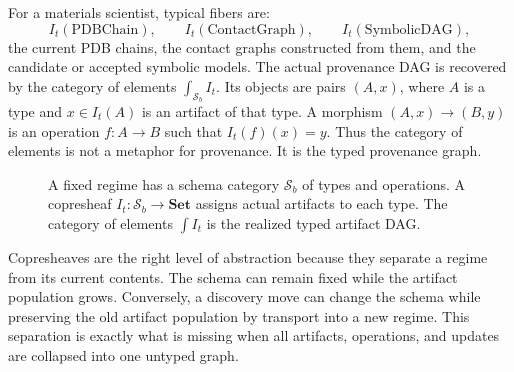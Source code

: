 \documentclass[11pt]{article}
\theoremstyle{definition}
\newcommand{\Sschema}{\mathcal{S}}
\newcommand{\Set}{\mathbf{Set}}
\begin{document}
For a materials scientist, typical fibers are:
\[
I_t(\mathrm{PDBChain}),\qquad
I_t(\mathrm{ContactGraph}),\qquad
I_t(\mathrm{SymbolicDAG}),
\]
the current PDB chains, the contact graphs constructed from them, and the candidate or accepted symbolic models. The actual provenance DAG is recovered by the category of elements $\int_{\Sschema_b} I_t$. Its objects are pairs $(A,x)$, where $A$ is a type and $x\in I_t(A)$ is an artifact of that type. A morphism $(A,x)\to(B,y)$ is an operation $f:A\to B$ such that $I_t(f)(x)=y$. Thus the category of elements is not a metaphor for provenance. It is the typed provenance graph.

\begin{figure}[t]
\centering
{}
\caption{A fixed regime has a schema category $\Sschema_b$ of types and operations. A copresheaf $I_t:\Sschema_b\to\Set$ assigns actual artifacts to each type. The category of elements $\int I_t$ is the realized typed artifact DAG.}
\label{fig:copresheaf_elements}
\end{figure}

Copresheaves are the right level of abstraction because they separate a regime from its current contents. The schema can remain fixed while the artifact population grows. Conversely, a discovery move can change the schema while preserving the old artifact population by transport into a new regime. This separation is exactly what is missing when all artifacts, operations, and updates are collapsed into one untyped graph.
\end{document}
